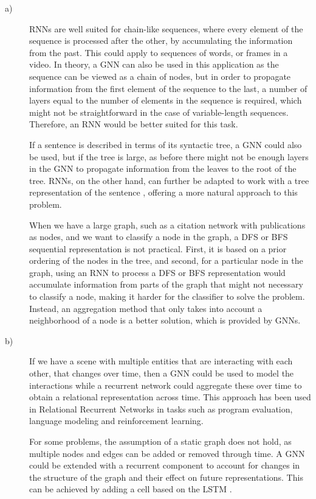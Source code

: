 \documentclass{article}
\begin{document}
\begin{description}
\item[a)] RNNs are well suited for chain-like sequences, where every element of the sequence is processed after the other, by accumulating the information from the past. This could apply to sequences of words, or frames in a video. In theory, a GNN can also be used in this application as the sequence can be viewed as a chain of nodes, but in order to propagate information from the first element of the sequence to the last, a number of layers equal to the number of elements in the sequence is required, which might not be straightforward in the case of variable-length sequences. Therefore, an RNN would be better suited for this task. 

If a sentence is described in terms of its syntactic tree, a GNN could also be used, but if the tree is large, as before there might not be enough layers in the GNN to propagate information from the leaves to the root of the tree. RNNs, on the other hand, can further be adapted to work with a tree representation of the sentence \cite{tai2015treelstm}, offering a more natural approach to this problem.

When we have a large graph, such as a citation network with publications as nodes, and we want to classify a node in the graph, a DFS or BFS sequential representation is not practical. First, it is based on a prior ordering of the nodes in the tree, and second, for a particular node in the graph, using an RNN to process a DFS or BFS representation would accumulate information from parts of the graph that might not necessary to classify a node, making it harder for the classifier to solve the problem. Instead, an aggregation method that only takes into account a neighborhood of a node is a better solution, which is provided by GNNs.

\item[b)] If we have a scene with multiple entities that are interacting with each other, that changes over time, then a GNN could be used to model the interactions while a recurrent network could aggregate these over time to obtain a relational representation across time. This approach has been used in Relational Recurrent Networks \cite{santoro2017relationalrnn} in tasks such as program evaluation, language modeling and reinforcement learning.

For some problems, the assumption of a static graph does not hold, as multiple nodes and edges can be added or removed through time. A GNN could be extended with a recurrent component to account for changes in the structure of the graph and their effect on future representations. This can be achieved by adding a cell based on the LSTM \cite{manessi2017dynamic,Ma2018StreamingGN}.
\end{description}





\end{document}
